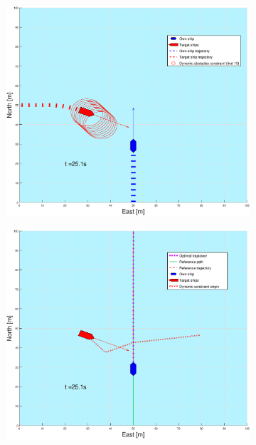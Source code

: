 \begin{figure}[ht!]
\begin{subfigure}[b]{0.499\textwidth}
    \end{subfigure}
    \hfill
    \\
    \begin{subfigure}[b]{0.49\textwidth}
        \centering
        \includegraphics[width=\textwidth]{Images/Figures/enkel_SO/_Simple_0fig1_time=25}
    \end{subfigure}
    \hfill
    \begin{subfigure}[b]{0.499\textwidth}
        \centering
        \includegraphics[width=\textwidth]{Images/Figures/enkel_SO/_Simple_0fig999_time=25}

\end{subfigure}
\end{figure}
